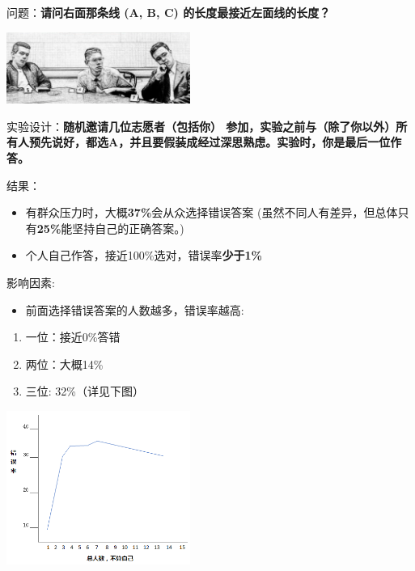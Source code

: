 问题：\textbf{请问右面那条线 (A, B, C) 的长度最接近左面线的长度？}


\includegraphics[width=6cm]{Asch2Screenshot2.png}

实验设计：\textbf{随机邀请几位志愿者（包括你）
参加，实验之前与（除了你以外）所有人预先说好，都选A，并且要假装成经过深思熟虑。实验时，你是最后一位作答。}

结果：

\begin{itemize}
\tightlist
\item
  有群众压力时，大概\textbf{37\%}会从众选择错误答案
  (虽然不同人有差异，但总体只有\textbf{25\%}能坚持自己的正确答案。)
\item
  个人自己作答，接近100\%选对，错误率\textbf{少于1\%}
\end{itemize}

影响因素:

\begin{itemize}
\tightlist
\item
  前面选择错误答案的人数越多，错误率越高:
\end{itemize}

\begin{enumerate}
\tightlist
\item
  一位：接近0\%答错
\item
  两位：大概14\%
\item
  三位: 32\%（详见下图）
\end{enumerate}




\includegraphics[width=6cm]{Asch3Screenshot_2022-07-08_2013411.png}

